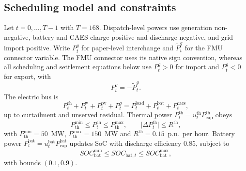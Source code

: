 \documentclass[conference]{IEEEtran}
\begin{document}
\subsection{Scheduling model and constraints}
\label{sec:constraints}

Let \(t=0,\ldots,T-1\) with \(T=168\). Dispatch-level powers use generation non-negative, battery and CAES charge positive and discharge negative, and grid import positive. Write \(P_t^{g}\) for paper-level interchange and \(\tilde P_t^{g}\) for the FMU connector variable. The FMU connector uses its native sign convention, whereas all scheduling and settlement equations below use \(P_t^{g}>0\) for import and \(P_t^{g}<0\) for export, with
\begin{equation}
P_t^{g}=-\tilde P_t^{g}.
\label{eq:grid-sign}
\end{equation}
The electric bus is
\begin{equation}
P_t^{\mathrm{th}}+P_t^{\mathrm{w}}+P_t^{\mathrm{pv}}+P_t^{g}
=
P_t^{\mathrm{load}}+P_t^{\mathrm{bat}}+P_t^{\mathrm{caes}},
\label{eq:balance}
\end{equation}
up to curtailment and unserved residual.
Thermal power \(P_t^{\mathrm{th}}=u_t^{\mathrm{th}}P_{\mathrm{cap}}^{\mathrm{th}}\) obeys
\begin{equation}
P_{\mathrm{th}}^{\min}\le P_t^{\mathrm{th}}\le P_{\mathrm{th}}^{\max},
\qquad
\bigl|\Delta P_t^{\mathrm{th}}\bigr|\le R^{\mathrm{th}},
\label{eq:th}
\end{equation}
with \(P_{\mathrm{th}}^{\min}=50\)~MW, \(P_{\mathrm{th}}^{\max}=150\)~MW and \(R^{\mathrm{th}}=0.15\)~p.u.\ per hour. Battery power \(P_t^{\mathrm{bat}}=u_t^{\mathrm{bat}}P_{\mathrm{cap}}^{\mathrm{bat}}\) updates SoC with discharge efficiency \(0.85\), subject to
\begin{equation}
SOC_{\mathrm{bat}}^{\min}\le SOC_{\mathrm{bat},t}\le SOC_{\mathrm{bat}}^{\max},
\label{eq:batsoc}
\end{equation}
with bounds \((0.1,0.9)\).
\end{document}
